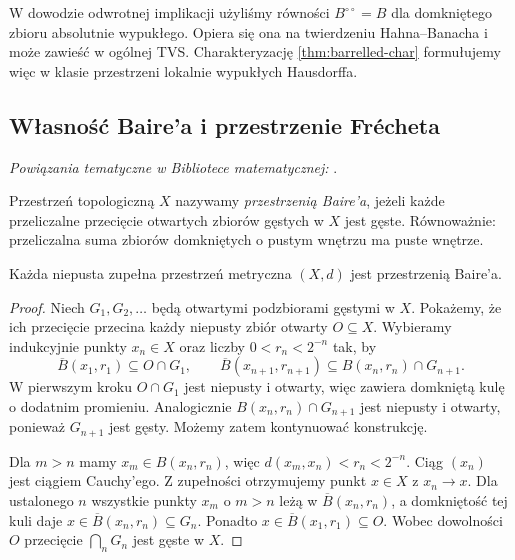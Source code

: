 \begin{uwaga}
W dowodzie odwrotnej implikacji użyliśmy równości
$B^{\circ\circ}=B$ dla domkniętego zbioru absolutnie
wypukłego. Opiera się ona na twierdzeniu Hahna--Banacha
i może zawieść w ogólnej TVS. Charakteryzację
\ref{thm:barrelled-char} formułujemy więc w klasie
przestrzeni lokalnie wypukłych Hausdorffa.
\end{uwaga}

\subsection{Własność Baire'a i przestrzenie Frécheta}

\noindent\emph{Powiązania tematyczne w Bibliotece matematycznej:} .


\begin{definicja}
Przestrzeń topologiczną $X$ nazywamy \emph{przestrzenią Baire'a},
jeżeli każde przeliczalne przecięcie otwartych zbiorów gęstych
w $X$ jest gęste. Równoważnie: przeliczalna suma zbiorów
domkniętych o pustym wnętrzu ma puste wnętrze.
\end{definicja}

\begin{twierdzenie}
\label{thm:baire-complete}
Każda niepusta zupełna przestrzeń metryczna $(X,d)$
jest przestrzenią Baire'a.
\end{twierdzenie}
\begin{proof}
Niech $G_1,G_2,\ldots$ będą otwartymi podzbiorami
gęstymi w $X$. Pokażemy, że ich przecięcie przecina
każdy niepusty zbiór otwarty $O\subseteq X$.
Wybieramy indukcyjnie punkty $x_n\in X$ oraz
liczby $0<r_n<2^{-n}$ tak, by
\[
 \overline{B}(x_1,r_1)\subseteq O\cap G_1,\qquad
 \overline{B}(x_{n+1},r_{n+1})\subseteq
 B(x_n,r_n)\cap G_{n+1}.
\]
W pierwszym kroku $O\cap G_1$ jest niepusty i otwarty,
więc zawiera domkniętą kulę o dodatnim promieniu.
Analogicznie $B(x_n,r_n)\cap G_{n+1}$ jest niepusty
i otwarty, ponieważ $G_{n+1}$ jest gęsty. Możemy
zatem kontynuować konstrukcję.

Dla $m>n$ mamy $x_m\in B(x_n,r_n)$, więc
$d(x_m,x_n)<r_n<2^{-n}$. Ciąg $(x_n)$ jest ciągiem
Cauchy'ego. Z zupełności otrzymujemy punkt $x\in X$
z $x_n\to x$. Dla ustalonego $n$ wszystkie punkty
$x_m$ o $m>n$ leżą w $\overline B(x_n,r_n)$,
a domkniętość tej kuli daje
$x\in\overline B(x_n,r_n)\subseteq G_n$.
Ponadto $x\in\overline B(x_1,r_1)\subseteq O$.
Wobec dowolności $O$ przecięcie $\bigcap_nG_n$
jest gęste w $X$.
\end{proof}

